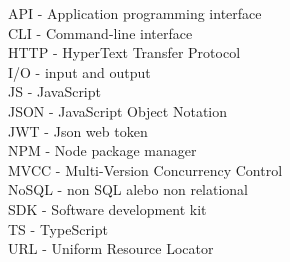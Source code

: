 API - Application programming interface\\
CLI - Command-line interface\\
HTTP - HyperText Transfer Protocol\\
I/O - input and output\\
JS - JavaScript\\
JSON - JavaScript Object Notation\\
JWT - Json web token\\
NPM - Node package manager\\
MVCC - Multi-Version Concurrency Control\\
NoSQL - non SQL alebo non relational\\
SDK - Software development kit\\
TS - TypeScript\\
URL - Uniform Resource Locator\\